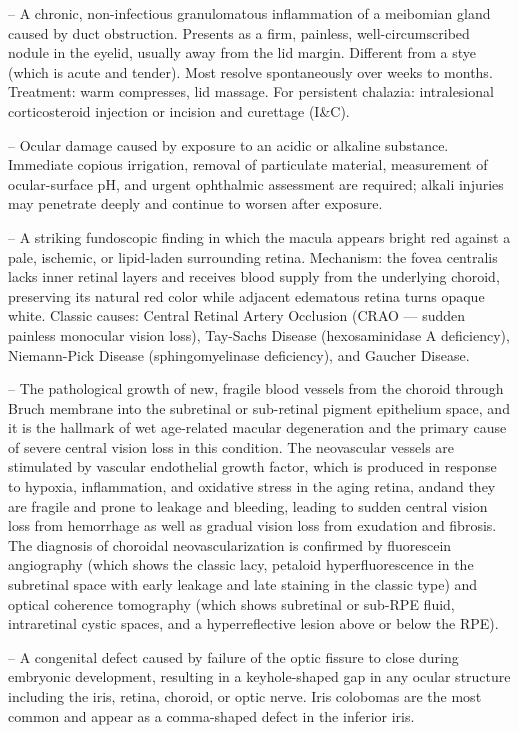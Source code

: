 -- A chronic, non-infectious granulomatous inflammation of a meibomian gland caused by duct obstruction. Presents as a firm, painless, well-circumscribed nodule in the eyelid, usually away from the lid margin. Different from a stye (which is acute and tender). Most resolve spontaneously over weeks to months. Treatment: warm compresses, lid massage. For persistent chalazia: intralesional corticosteroid injection or incision and curettage (I\&C).

-- Ocular damage caused by exposure to an acidic or alkaline substance. Immediate copious irrigation, removal of particulate material, measurement of ocular-surface pH, and urgent ophthalmic assessment are required; alkali injuries may penetrate deeply and continue to worsen after exposure.

-- A striking fundoscopic finding in which the macula appears bright red against a pale, ischemic, or lipid-laden surrounding retina. Mechanism: the fovea centralis lacks inner retinal layers and receives blood supply from the underlying choroid, preserving its natural red color while adjacent edematous retina turns opaque white. Classic causes: Central Retinal Artery Occlusion (CRAO — sudden painless monocular vision loss), Tay-Sachs Disease (hexosaminidase A deficiency), Niemann-Pick Disease (sphingomyelinase deficiency), and Gaucher Disease.

-- The pathological growth of new, fragile blood vessels from the choroid through Bruch membrane into the subretinal or sub-retinal pigment epithelium space, and it is the hallmark of wet age-related macular degeneration and the primary cause of severe central vision loss in this condition. The neovascular vessels are stimulated by vascular endothelial growth factor, which is produced in response to hypoxia, inflammation, and oxidative stress in the aging retina, andand they are fragile and prone to leakage and bleeding, leading to sudden central vision loss from hemorrhage as well as gradual vision loss from exudation and fibrosis. The diagnosis of choroidal neovascularization is confirmed by fluorescein angiography (which shows the classic lacy, petaloid hyperfluorescence in the subretinal space with early leakage and late staining in the classic type) and optical coherence tomography (which shows subretinal or sub-RPE fluid, intraretinal cystic spaces, and a hyperreflective lesion above or below the RPE).

-- A congenital defect caused by failure of the optic fissure to close during embryonic development, resulting in a keyhole-shaped gap in any ocular structure including the iris, retina, choroid, or optic nerve. Iris colobomas are the most common and appear as a comma-shaped defect in the inferior iris.

